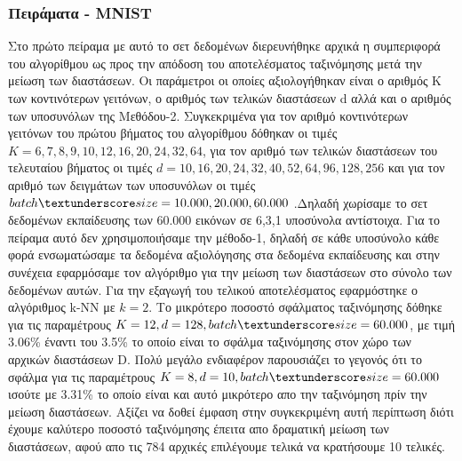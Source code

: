 \subsubsection{Πειράματα - \textlatin{MNIST}}
\par
Στο πρώτο πείραμα με αυτό το σετ δεδομένων διερευνήθηκε αρχικά η συμπεριφορά του αλγορίθμου ως προς την απόδοση του αποτελέσματος ταξινόμησης μετά την μείωση των διαστάσεων. Οι παράμετροι οι οποίες αξιολογήθηκαν είναι ο αριθμός Κ των κοντινότερων γειτόνων, ο αριθμός των τελικών διαστάσεων \textlatin{d} αλλά και ο αριθμός των υποσυνόλων της Μεθόδου-2. Συγκεκριμένα για τον αριθμό κοντινότερων γειτόνων του πρώτου βήματος του αλγορίθμου δόθηκαν οι τιμές $K = 6,7,8,9,10,12,16,20,24,32,64$, για τον αριθμό των τελικών διαστάσεων του τελευταίου βήματος οι τιμές $d = 10,16,20,24,32,40,52,64,96,128,256$ και για τον αριθμό των δειγμάτων των υποσυνόλων οι τιμές $batch\textunderscore size = 10.000,20.000,60.000$ .Δηλαδή χωρίσαμε το σετ δεδομένων εκπαίδευσης των 60.000 εικόνων σε 6,3,1 υποσύνολα αντίστοιχα. Για το πείραμα αυτό δεν χρησιμοποιήσαμε την μέθοδο-1, δηλαδή σε κάθε υποσύνολο κάθε φορά ενσωματώσαμε τα δεδομένα αξιολόγησης στα δεδομένα εκπαίδευσης και στην συνέχεια εφαρμόσαμε τον αλγόριθμο για την μείωση των διαστάσεων στο σύνολο των δεδομένων αυτών. Για την εξαγωγή του τελικού αποτελέσματος εφαρμόστηκε ο αλγόριθμος \textlatin{k-NN} με $k=2$. Το μικρότερο ποσοστό σφάλματος ταξινόμησης δόθηκε για τις παραμέτρους $K=12, d=128, batch\textunderscore size=60.000$, με τιμή 3.06\% έναντι του 3.5\% το οποίο είναι το σφάλμα ταξινόμησης στον χώρο των αρχικών διαστάσεων \textlatin{D}. Πολύ μεγάλο ενδιαφέρον παρουσιάζει το γεγονός ότι το σφάλμα για τις παραμέτρους $K=8, d=10, batch\textunderscore size=60.000$ ισούτε με 3.31\% το οποίο είναι και αυτό μικρότερο απο την ταξινόμηση πρίν την μείωση διαστάσεων. Αξίζει να δοθεί έμφαση στην συγκεκριμένη αυτή περίπτωση διότι έχουμε καλύτερο ποσοστό ταξινόμησης έπειτα απο δραματική μείωση των διαστάσεων, αφού απο τις 784 αρχικές επιλέγουμε τελικά να κρατήσουμε 10 τελικές. 
\par
